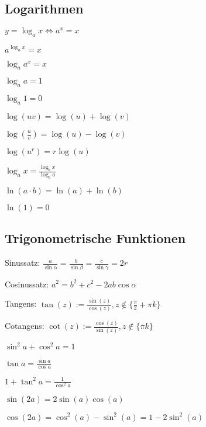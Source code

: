 \subsection{Logarithmen}
$y = \log_a x \iff a^x = x$
\begin{compactitem}
    \item $a^{\log_a x} = x$
    \item $\log_a a^x = x$
    \item 
        \begin{inparaitem}
            \item $\log_a a = 1$
            \item $\log_a 1 = 0$
        \end{inparaitem}
    \item $\log(uv) = \log(u) + \log(v)$
    \item $\log(\frac{u}{v}) = \log(u) - \log(v)$
    \item $\log(u^r) = r \log(u)$
    \item $\log_a x = \frac{\log_b x}{\log_b a}$
    \item $\ln(a \cdot b) = \ln(a) + \ln(b)$
    \item $\ln(1) = 0$
\end{compactitem}

\subsection{Trigonometrische Funktionen}
\begin{compactdesc}
    \item[Sinussatz:] $\frac{a}{\sin \alpha} = \frac{b}{\sin \beta} = \frac{c}{\sin \gamma} = 2r$
    \item[Cosinussatz:] $a^2 = b^2 + c^2 - 2ab \cos \alpha$
    \item[Tangens:] $\tan(z) := \frac{\sin(z)}{\cos(z)}, z \not\in \{\frac{\pi}{2} + \pi k\}$
    \item[Cotangens:] $\cot(z) := \frac{\cos(z)}{\sin(z)}, z \not\in \{\pi k\}$
\end{compactdesc}

\begin{compactitem}
    \item $\sin^2a + \cos^2a = 1$
    \item $\tan a = \frac{\sin a}{\cos a}$
    \item $1 + \tan^2 a = \frac{1}{\cos^2 a}$
    \item $\sin(2a) = 2\sin(a) \cos(a)$
    \item $\cos(2a) = \cos^2(a) - \sin^2(a) = 1 - 2 \sin^2(a)$
\end{compactitem}


